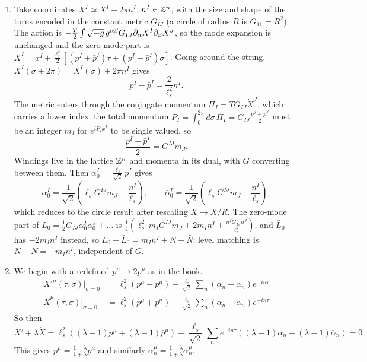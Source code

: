 \documentclass[11pt, class=article, crop=false]{standalone}
\begin{document}
\begin{enumerate}
		\item Take coordinates $X^I \simeq X^I + 2 \pi n^I$, $n^I \in \mathbb{Z}^n$, with the size and shape of the torus encoded in the constant metric $G_{IJ}$ (a circle of radius $R$ is $G_{11} = R^2$). The action is $-\frac{T}{2} \int \sqrt{-g}\, g^{\alpha \beta} G_{IJ} \partial_\alpha X^I \partial_\beta X^J$, so the mode expansion is unchanged and the zero-mode part is $X^I = x^I + \frac{\ell_s^2}{2}\left[(p^I + \bar p^I) \tau + (p^I - \bar p^I) \sigma\right]$. Going around the string, $X^I(\sigma + 2\pi) = X^I(\sigma) + 2 \pi n^I$ gives
		\begin{equation}
			p^I - \bar p^I = \frac{2}{\ell_s^2} n^I.
		\end{equation}
		The metric enters through the conjugate momentum $\Pi_I = T G_{IJ} \dot X^J$, which carries a lower index: the total momentum $P_I = \int_0^{2\pi} d\sigma\, \Pi_I = G_{IJ} \frac{p^J + \bar p^J}{2}$ must be an integer $m_I$ for $e^{i P_I x^I}$ to be single valued, so
		\begin{equation}
			\frac{p^I + \bar p^I}{2} = G^{IJ} m_J.
		\end{equation}
		Windings live in the lattice $\mathbb{Z}^n$ and momenta in its dual, with $G$ converting between them. Then $\alpha_0^I = \frac{\ell_s}{\sqrt 2} p^I$ gives
		\begin{equation}
			\alpha^I_0 = \frac{1}{\sqrt 2} \left(\ell_s G^{IJ} m_J + \frac{n^I}{\ell_s}\right), \qquad \bar \alpha^I_0 = \frac{1}{\sqrt 2} \left(\ell_s G^{IJ} m_J - \frac{n^I}{\ell_s}\right),
		\end{equation}
		which reduces to the circle result after rescaling $X \to X/R$. The zero-mode part of $L_0 = \frac12 G_{IJ} \alpha_0^I \alpha_0^J + \dots$ is $\frac14\left(\ell_s^2\, m_I G^{IJ} m_J + 2 m_I n^I + \frac{n^I G_{IJ} n^J}{\ell_s^2}\right)$, and $\bar L_0$ has $-2 m_I n^I$ instead, so $L_0 - \bar L_0 = m_I n^I + N - \bar N$: level matching is $N - \bar N = -m_I n^I$, independent of $G$.
		
		\item
		We begin with a redefined $p^\mu \to 2 p^\mu$ as in the book.
		\begin{equation}
			\begin{aligned}
				{X'}^\mu(\tau, \sigma)|_{\sigma = 0} &= \ell_s^2 (p^\mu - \bar p^\mu) + \frac{\ell_s}{\sqrt 2} \sum_{n} (\alpha_n - \bar \alpha_{n}) e^{- i n \tau}
				\\{\dot X}^\mu(\tau, \sigma)|_{\sigma = 0} &=  \ell_s^2 (p^\mu + \bar p^\mu) + \frac{\ell_s}{\sqrt 2} \sum_{n} (\alpha_n + \bar \alpha_n)e^{-in\tau}
			\end{aligned}
		\end{equation}
		So then
		\[
			X' + \lambda \dot X = \ell_s^2 \left((\lambda + 1) p^\mu + (\lambda - 1) \bar p^\mu\right) + \frac{\ell_s}{\sqrt 2} \sum_{n} e^{-in\tau} \left((\lambda + 1) \alpha_n + (\lambda-1) \bar \alpha_n\right) = 0
		\]
		This gives $p^\mu = \frac{1-\lambda}{1+\lambda} \bar p^\mu$ and similarly $\alpha^\mu_n = \frac{1-\lambda}{1+\lambda} \bar \alpha_n^\mu$. 
		

\end{enumerate}
\end{document}
